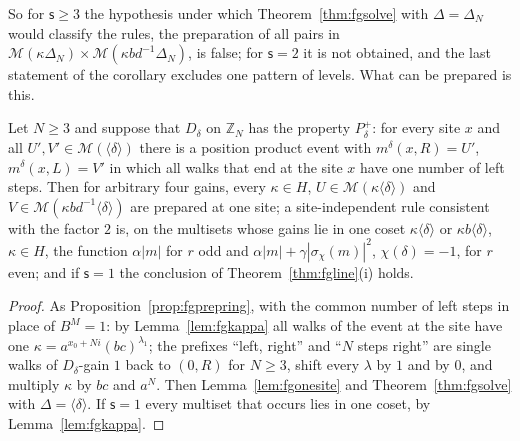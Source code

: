 So for $\mathsf{s}\ge3$ the hypothesis under which Theorem~\ref{thm:fgsolve} with $\Delta=\Delta_N$ would classify the rules, the preparation of all pairs in $\mathcal{M}(\kappa\Delta_N)\times\mathcal{M}(\kappa bd^{-1}\Delta_N)$, is false; for $\mathsf{s}=2$ it is not obtained, and the last statement of the corollary excludes one pattern of levels. What can be prepared is this.

\begin{proposition}\label{prop:fgonelevel}
Let $N\ge3$ and suppose that $D_\delta$ on $\mathbb{Z}_N$ has the property $P^{+}_\delta$: for every site $x$ and all $U',V'\in\mathcal{M}(\langle\delta\rangle)$ there is a position product event with $m^\delta(x,R)=U'$, $m^\delta(x,L)=V'$ in which all walks that end at the site $x$ have one number of left steps. Then for arbitrary four gains, every $\kappa\in H$, $U\in\mathcal{M}(\kappa\langle\delta\rangle)$ and $V\in\mathcal{M}(\kappa bd^{-1}\langle\delta\rangle)$ are prepared at one site; a site-independent rule consistent with the factor $2$ is, on the multisets whose gains lie in one coset $\kappa\langle\delta\rangle$ or $\kappa b\langle\delta\rangle$, $\kappa\in H$, the function $\alpha|m|$ for $r$ odd and $\alpha|m|+\gamma|\sigma_\chi(m)|^{2}$, $\chi(\delta)=-1$, for $r$ even; and if $\mathsf{s}=1$ the conclusion of Theorem~\ref{thm:fgline}(i) holds.
\end{proposition}
\begin{proof}
As Proposition~\ref{prop:fgprepring}, with the common number of left steps in place of $B^{M}=1$: by Lemma~\ref{lem:fgkappa} all walks of the event at the site have one $\kappa=a^{x_0+Ni}(bc)^{\lambda_1}$; the prefixes ``left, right'' and ``$N$ steps right'' are single walks of $D_\delta$-gain $1$ back to $(0,R)$ for $N\ge3$, shift every $\lambda$ by $1$ and by $0$, and multiply $\kappa$ by $bc$ and $a^{N}$. Then Lemma~\ref{lem:fgonesite} and Theorem~\ref{thm:fgsolve} with $\Delta=\langle\delta\rangle$. If $\mathsf{s}=1$ every multiset that occurs lies in one coset, by Lemma~\ref{lem:fgkappa}.
\end{proof}


